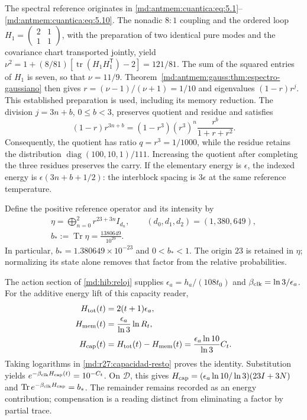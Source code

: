 The spectral reference originates in
\eqref{md:antmem:cuantica:eq:5.1}--\eqref{md:antmem:cuantica:eq:5.10}.
The nonadic $8:1$ coupling and the ordered loop
$H_1=\left(\begin{smallmatrix}2&1\\1&1\end{smallmatrix}\right)$,
with the preparation of two identical pure modes and the covariance chart
transported jointly, yield
$\nu^2=1+(8/81)[\operatorname{tr}(H_1H_1^{\mathsf T})-2]=121/81$.
The sum of the squared entries of $H_1$ is seven, so that
$\nu=11/9$. Theorem~\ref{md:antmem:gauss:thm:espectro-gaussiano}
then gives $r=(\nu-1)/(\nu+1)=1/10$ and eigenvalues $(1-r)r^j$.
This established preparation is used, including its memory reduction.
The division $j=3n+b$, $0\le b<3$, preserves quotient and residue and satisfies
\begin{equation}
 (1-r)r^{3n+b}=(1-r^3)(r^3)^n\frac{r^b}{1+r+r^2}.
 \label{md:r27:factorizacion}
\end{equation}
Consequently, the quotient has ratio $q=r^3=1/1000$, while the residue retains
the distribution $\operatorname{diag}(100,10,1)/111$. Increasing the quotient
after completing the three residues preserves the carry. If the elementary
energy is $\epsilon$, the indexed energy is $\epsilon(3n+b+1/2)$: the
interblock spacing is $3\epsilon$ at the same reference temperature.

Define the positive reference operator and its intensity by
\begin{equation}
 \begin{gathered}
 \eta=\bigoplus_{n=0}^{2}r^{23+3n}I_{d_n},\qquad
 (d_0,d_1,d_2)=(1,380,649),\\
 b_*:=\operatorname{Tr}\eta=\frac{1380649}{10^{29}}.
 \end{gathered}
 \label{md:r27:eta}
\end{equation}
In particular, $b_*=1.380649\times10^{-23}$ and $0<b_*<1$.
The origin $23$ is retained in $\eta$; normalizing its state alone
removes that factor from the relative probabilities.

The action section of \eqref{md:hib:reloj} supplies
$\epsilon_a=h_a/(108t_0)$ and $\beta_{\rm clk}=\ln3/\epsilon_a$.
For the additive energy lift of this capacity reader,
\begin{equation}
 \begin{split}
 H_{\rm tot}(t)&=2(t+1)\epsilon_a,\\
 H_{\rm mem}(t)&=\frac{\epsilon_a}{\ln3}\ln R_t,\\
 H_{\rm cap}(t)&=H_{\rm tot}(t)-H_{\rm mem}(t)
 =\frac{\epsilon_a\ln10}{\ln3}C_t.
 \end{split}
 \label{md:r27:energia-capacidad}
\end{equation}
Taking logarithms in \eqref{md:r27:capacidad-resto} proves the identity.
Substitution yields $e^{-\beta_{\rm clk}H_{\rm cap}(t)}=10^{-C_t}$.
On $\mathcal D$, this gives
$H_{\rm cap}=(\epsilon_a\ln10/\ln3)(23I+3N)$ and
$\operatorname{Tr}e^{-\beta_{\rm clk}H_{\rm cap}}=b_*$.
The remainder remains recorded as an energy contribution; compensation
is a reading distinct from eliminating a factor by partial trace.

